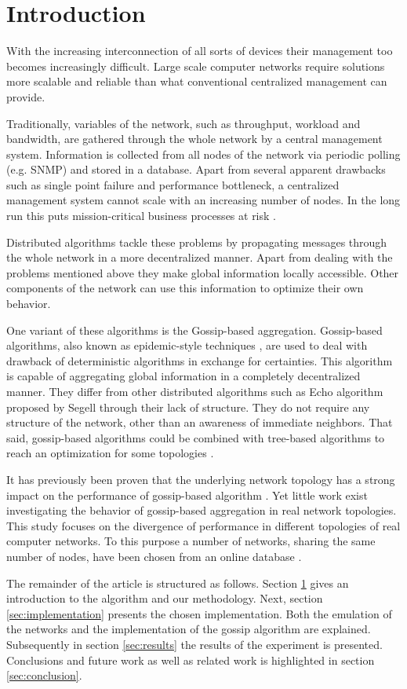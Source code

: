 \section{Introduction}
\label{sec:theory}
With the increasing interconnection of all sorts of devices their management too becomes increasingly difficult. Large scale computer networks require solutions more scalable and reliable than what conventional centralized management can provide.

Traditionally, variables of the network, such as throughput, workload and bandwidth, are gathered through the whole network by a central management system. Information is collected from all nodes of the network via periodic polling (e.g. SNMP) and stored in a database. Apart from several apparent drawbacks such as single point failure and performance bottleneck, a centralized management system cannot scale with an increasing number of nodes. In the long run this puts mission-critical business processes at risk \cite{Stadler529980}.

Distributed algorithms tackle these problems by propagating messages through the whole network in a more decentralized manner. Apart from dealing with the problems mentioned above they make global information locally accessible. Other components of the network can use this information to optimize their own behavior\cite{jelasity_gossip-based_2005}.

One variant of these algorithms is the Gossip-based aggregation. Gossip-based algorithms, also known as epidemic-style techniques \cite{I.Gupta2006}, are used to deal with drawback of deterministic algorithms in exchange for certainties. This algorithm is capable of aggregating global information in a completely decentralized manner. They differ from other distributed algorithms such as Echo algorithm proposed by Segell \cite{SegallG89} through their lack of structure. They do not require any structure of the network, other than an awareness of immediate neighbors. That said, gossip-based algorithms could be combined with tree-based algorithms to reach an optimization for some topologies \cite{KyasanurCG06}.

It has previously been proven that the underlying network topology has a strong impact on the performance of gossip-based algorithm \cite{5929538, jelasity_gossip-based_2003}. Yet little work exist investigating the behavior of gossip-based aggregation in real network topologies. This study focuses on the divergence of performance in different topologies of real computer networks. To this purpose a number of networks, sharing the same number of nodes, have been chosen from an online database \cite{knight_internet_2011}.

The remainder of the article is structured as follows. Section \ref{sec:theory} gives an introduction to the algorithm and our methodology. Next, section \ref{sec:implementation} presents the chosen implementation. Both the emulation of the networks and the implementation of the gossip algorithm are explained. Subsequently in section \ref{sec:results} the results of the experiment is presented. Conclusions and future work as well as related work is highlighted in section \ref{sec:conclusion}.
